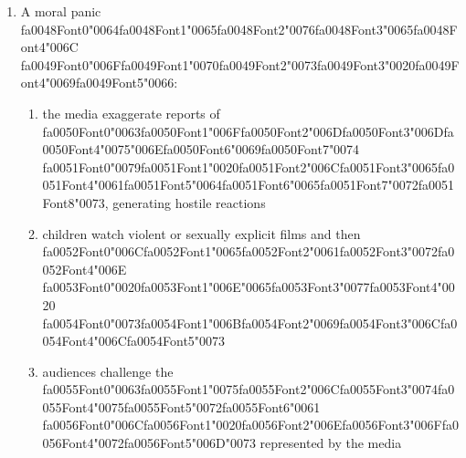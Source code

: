 \documentclass[12pt]{article}
\begin{document}
\begin{enumerate}[label=\arabic*.]
\begin{enumerate}[label=(\alph*)]
\end{enumerate}
\item A moral panic {\csname fa0048Font0\endcsname\char"0064}{\csname fa0048Font1\endcsname\char"0065}{\csname fa0048Font2\endcsname\char"0076}{\csname fa0048Font3\endcsname\char"0065}{\csname fa0048Font4\endcsname\char"006C} {\csname fa0049Font0\endcsname\char"006F}{\csname fa0049Font1\endcsname\char"0070}{\csname fa0049Font2\endcsname\char"0073}{\csname fa0049Font3\endcsname\char"0020}{\csname fa0049Font4\endcsname\char"0069}{\csname fa0049Font5\endcsname\char"0066}:
\begin{enumerate}[label=(\alph*)]
    \item the media exaggerate reports of {\csname fa0050Font0\endcsname\char"0063}{\csname fa0050Font1\endcsname\char"006F}{\csname fa0050Font2\endcsname\char"006D}{\csname fa0050Font3\endcsname\char"006D}{\csname fa0050Font4\endcsname\char"0075}{\char"006E}{\csname fa0050Font6\endcsname\char"0069}{\csname fa0050Font7\endcsname\char"0074} {\csname fa0051Font0\endcsname\char"0079}{\csname fa0051Font1\endcsname\char"0020}{\csname fa0051Font2\endcsname\char"006C}{\csname fa0051Font3\endcsname\char"0065}{\csname fa0051Font4\endcsname\char"0061}{\csname fa0051Font5\endcsname\char"0064}{\csname fa0051Font6\endcsname\char"0065}{\csname fa0051Font7\endcsname\char"0072}{\csname fa0051Font8\endcsname\char"0073}, generating hostile reactions
    \item children watch violent or sexually explicit films and then {\csname fa0052Font0\endcsname\char"006C}{\csname fa0052Font1\endcsname\char"0065}{\csname fa0052Font2\endcsname\char"0061}{\csname fa0052Font3\endcsname\char"0072}{\csname fa0052Font4\endcsname\char"006E} {\csname fa0053Font0\endcsname\char"0020}{\csname fa0053Font1\endcsname\char"006E}{\char"0065}{\csname fa0053Font3\endcsname\char"0077}{\csname fa0053Font4\endcsname\char"0020} {\csname fa0054Font0\endcsname\char"0073}{\csname fa0054Font1\endcsname\char"006B}{\csname fa0054Font2\endcsname\char"0069}{\csname fa0054Font3\endcsname\char"006C}{\csname fa0054Font4\endcsname\char"006C}{\csname fa0054Font5\endcsname\char"0073}
    \item audiences challenge the {\csname fa0055Font0\endcsname\char"0063}{\csname fa0055Font1\endcsname\char"0075}{\csname fa0055Font2\endcsname\char"006C}{\csname fa0055Font3\endcsname\char"0074}{\csname fa0055Font4\endcsname\char"0075}{\csname fa0055Font5\endcsname\char"0072}{\csname fa0055Font6\endcsname\char"0061} {\csname fa0056Font0\endcsname\char"006C}{\csname fa0056Font1\endcsname\char"0020}{\csname fa0056Font2\endcsname\char"006E}{\csname fa0056Font3\endcsname\char"006F}{\csname fa0056Font4\endcsname\char"0072}{\csname fa0056Font5\endcsname\char"006D}{\char"0073} represented by the media

\end{enumerate}
\end{enumerate}
\end{document}
